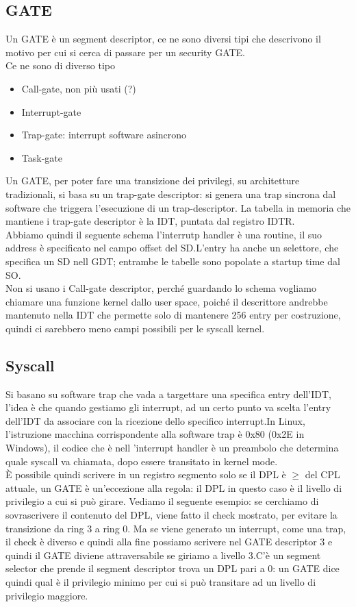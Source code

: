 \documentclass[12pt, oneside]{extbook} %
\begin{document}
\subsection{GATE}
Un GATE è un segment descriptor, ce ne sono diversi tipi che descrivono il motivo per cui si cerca di passare per un security GATE.\\Ce ne sono di diverso tipo
\begin{itemize}
\item Call-gate, non più usati (?)
\item Interrupt-gate
\item Trap-gate: interrupt software asincrono
\item Task-gate
\end{itemize}
Un GATE, per poter fare una transizione dei privilegi, su architetture tradizionali, si basa su un trap-gate descriptor: si genera una trap sincrona dal software che triggera l'esecuzione di un trap-descriptor. La tabella in memoria che mantiene i trap-gate descriptor è la IDT, puntata dal registro IDTR.\\Abbiamo quindi il seguente schema
l'interrutp handler è una routine, il suo address è specificato nel campo offset del SD.L'entry ha anche un selettore, che specifica un SD nell GDT; entrambe le tabelle sono popolate a startup time dal SO.\\Non si usano i Call-gate descriptor, perché guardando lo schema vogliamo chiamare una funzione kernel dallo user space, poiché il descrittore andrebbe mantenuto nella IDT che permette solo di mantenere 256 entry per costruzione, quindi ci sarebbero meno campi possibili per le syscall kernel.
\subsection{Syscall}
Si basano su software trap che vada a targettare una specifica entry dell'IDT, l'idea è che quando gestiamo gli interrupt, ad un certo punto va scelta l'entry dell'IDT da associare con la ricezione dello specifico interrupt.In Linux, l'istruzione macchina corrispondente alla software trap è 0x80 (0x2E in Windows), il codice che è nell 'interrupt handler è un preambolo che determina quale syscall va chiamata, dopo essere transitato in kernel mode.\\È possibile quindi scrivere in un registro segmento solo se il DPL è $\geq$ del CPL attuale, un GATE è un'eccezione alla regola: il DPL in questo caso è il livello di privilegio a cui si può girare. Vediamo il seguente esempio:
se cerchiamo di sovrascrivere il contenuto del DPL, viene fatto il check mostrato, per evitare la transizione da ring 3 a ring 0. Ma se viene generato un interrupt, come una trap, il check è diverso e quindi alla fine possiamo scrivere nel GATE descriptor 3 e quindi il GATE diviene attraversabile se giriamo a livello 3.C'è un segment selector che prende il segment descriptor trova un DPL pari a 0: un GATE dice quindi qual è il privilegio minimo per cui si può transitare ad un livello di privilegio maggiore.
\end{document}
